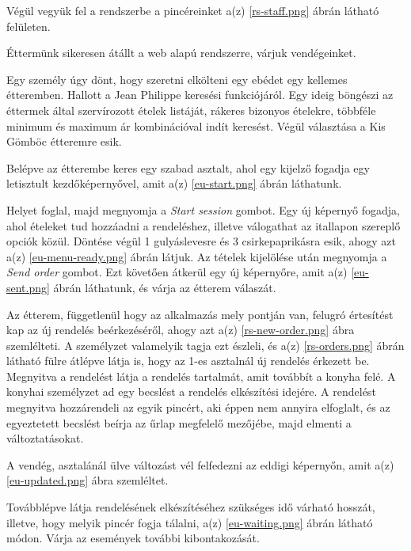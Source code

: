 Végül vegyük fel a rendszerbe a pincéreinket a(z) \ref{rs-staff.png} ábrán látható felületen.


Éttermünk sikeresen átállt a web alapú rendszerre, várjuk vendégeinket.

Egy személy úgy dönt, hogy szeretni elkölteni egy ebédet egy kellemes étteremben. Hallott a Jean Philippe keresési funkciójáról. Egy ideig böngészi az éttermek által szervírozott ételek listáját, rákeres bizonyos ételekre, többféle minimum és maximum ár kombinációval indít keresést. Végül választása a Kis Gömböc étteremre esik.


Belépve az étterembe keres egy szabad asztalt, ahol egy kijelző fogadja egy letisztult kezdőképernyővel, amit a(z) \ref{eu-start.png} ábrán láthatunk.

Helyet foglal, majd megnyomja a \emph{Start session} gombot. Egy új képernyő fogadja, ahol ételeket tud hozzáadni a rendeléshez, illetve válogathat az itallapon szereplő opciók közül. Döntése végül 1 gulyáslevesre és 3 csirkepaprikásra esik, ahogy azt a(z) \ref{eu-menu-ready.png} ábrán látjuk. Az tételek kijelölése után megnyomja a \emph{Send order} gombot. Ezt követően átkerül egy új képernyőre, amit a(z) \ref{eu-sent.png} ábrán láthatunk, és várja az étterem válaszát.

Az étterem, függetlenül hogy az alkalmazás mely pontján van, felugró értesítést kap az új rendelés beérkezéséről, ahogy azt a(z) \ref{rs-new-order.png} ábra szemlélteti. A személyzet valamelyik tagja ezt észleli, és a(z) \ref{rs-orders.png} ábrán látható fülre átlépve látja is, hogy az 1-es asztalnál új rendelés érkezett be. Megnyitva a rendelést látja a rendelés tartalmát, amit továbbít a konyha felé. A konyhai személyzet ad egy becslést a rendelés elkészítési idejére. A rendelést megnyitva hozzárendeli az egyik pincért, aki éppen nem annyira elfoglalt, és az egyeztetett becslést beírja az űrlap megfelelő mezőjébe, majd elmenti a változtatásokat. \par


A vendég, asztalánál ülve változást vél felfedezni az eddigi képernyőn, amit a(z) \ref{eu-updated.png} ábra szemléltet.

Továbblépve látja rendelésének elkészítéséhez szükséges idő várható hosszát, illetve, hogy melyik pincér fogja tálalni, a(z) \ref{eu-waiting.png} ábrán látható módon. Várja az események további kibontakozását.

